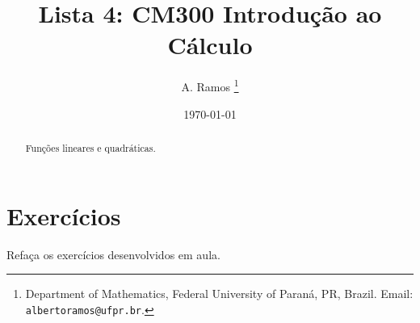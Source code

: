 \documentclass[11pt]{article}
\begin{document}
\title{Lista 4: CM300 Introdução ao Cálculo }
 
\author{
A. Ramos \thanks{Department of Mathematics,
    Federal University of Paraná, PR, Brazil.
    Email: {\tt albertoramos@ufpr.br}.}
}

\date{\today}
 
\maketitle

\begin{abstract}
   Funções lineares e quadráticas.   
\end{abstract}
 
  \section{Exercícios}   
 
 Refaça os exercícios desenvolvidos em aula.
 
\end{document}
